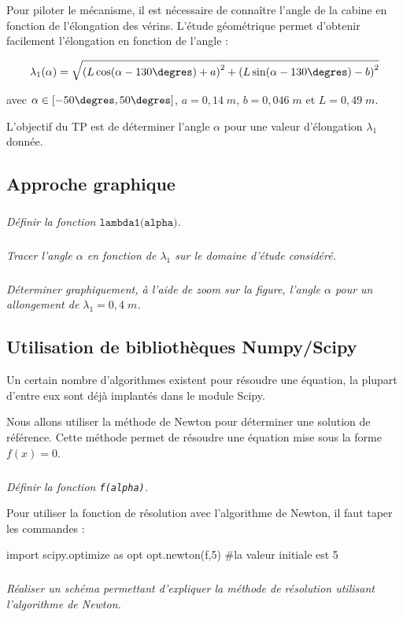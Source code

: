 \documentclass[10pt]{article}
\begin{document}
Pour piloter le mécanisme, il est nécessaire de connaître l'angle de la cabine en fonction de l'élongation des vérins. L'étude géométrique permet d'obtenir facilement l'élongation en fonction de l'angle :

$$\lambda_1(\alpha) = \sqrt{\left(L\cos(\alpha-130\degres)  +a\right)^2+\left(L\sin(\alpha-{130}{\degres})-b\right)^2} $$ 

avec $\alpha\in[{-50}{\degres}, {50}{\degres}]$, $a = {0,14}{\; m}$, $b = {0,046}{\; m}$ et $L = {0,49}{\; m}$.
\begin{obj}
L'objectif du TP est de déterminer l'angle $\alpha$ pour une valeur d'élongation $\lambda_1$ donnée.
\end{obj}
\subsection{Approche graphique}

\subparagraph{}\textit{Définir la fonction $\texttt{lambda1(alpha)}$.}

\subparagraph{}\textit{Tracer l'angle $\alpha$ en fonction de $\lambda_1$ sur le domaine d'étude considéré.}

\subparagraph{}\textit{Déterminer graphiquement, à l'aide de zoom sur la figure, l'angle $\alpha$ pour un allongement de $\lambda_1={0,4}{\; m}$.}

\subsection{Utilisation de bibliothèques Numpy/Scipy}
Un certain nombre d'algorithmes existent pour résoudre une équation, la plupart d'entre eux sont déjà implantés dans le module Scipy.

Nous allons utiliser la méthode de Newton pour déterminer une solution de référence. Cette méthode permet de résoudre une équation mise sous la forme $f(x) = 0$.

\subparagraph{}\textit{Définir la fonction \texttt{f(alpha)}.}

Pour utiliser la fonction de résolution avec l'algorithme de Newton, il faut taper les commandes :
\begin{py}
\begin{python}
import scipy.optimize as opt
opt.newton(f,5)  #la valeur initiale est 5
\end{python}
\end{py}

\subparagraph{}
\textit{Réaliser un schéma permettant d'expliquer la méthode de résolution utilisant l'algorithme de Newton.}
\end{document}
